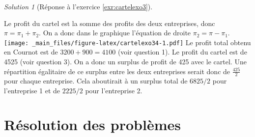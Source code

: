 \documentclass[
]{book}
\theoremstyle{definition}
\theoremstyle{definition}
\theoremstyle{definition}
\theoremstyle{definition}
\theoremstyle{remark}
\newtheorem*{solution}{Solution}
\begin{document}
\begin{solution}[Réponse à l'exercice \ref{exr:cartelexo3}]
\begin{enumerate}
  Le profit du cartel est la somme des profits des deux entreprises, donc \(\pi=\pi_1+ \pi_2\).
  On a donc dans le graphique l'équation de droite \(\pi_2=\pi- \pi_1\).
  \texttt{[image: \_main\_files/figure-latex/cartelexo34-1.pdf]}
  Le profit total obtenu en Cournot est de \(3200+900=4100\) (voir question 1).
  Le profit du cartel est de 4525 (voir question 3).
  On a donc un surplus de profit de 425 avec le cartel.
  Une répartition égalitaire de ce surplus entre les deux entreprises serait donc de \(\frac{425}{2}\) pour chaque entreprise.
  Cela aboutirait à un surplus total de \(6825/2\) pour l'entreprise 1 et de \(2225/2\) pour l'entreprise 2.
\end{enumerate}

\end{solution}

\hypertarget{appendix-annexes}{%
\appendix}


\hypertarget{ruxe9solution-des-probluxe8mes}{%
\chapter{Résolution des problèmes}\label{ruxe9solution-des-probluxe8mes}}
\end{document}
